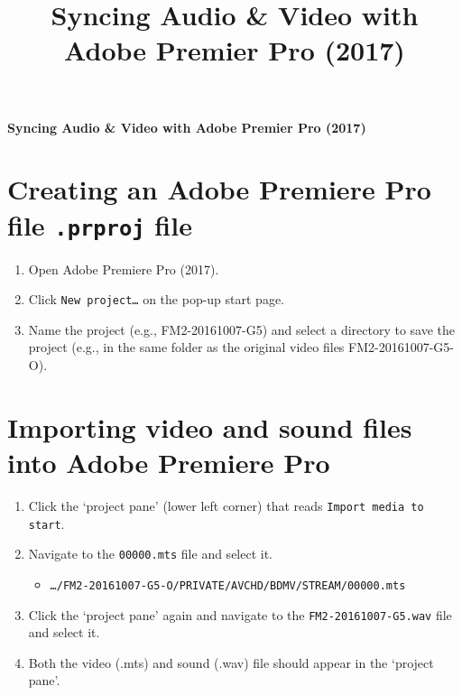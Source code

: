 \documentclass{article}
\title{Syncing Audio \& Video with Adobe Premier Pro (2017)}
\date{}
\newenvironment{myenv}[1]
  {\mdfsetup{
    frametitle={\colorbox{white}{\space#1\space}},
    innertopmargin=10pt,
    frametitleaboveskip=-\ht\strutbox,
    frametitlealignment=\center
    }
  \begin{mdframed}%
  }
  {\end{mdframed}}
\begin{document}
\thispagestyle{empty}
\begin{center}
{\Large\textbf{Syncing Audio \& Video with Adobe Premier Pro (2017)}}
\end{center}
%
%

\section*{Creating an Adobe Premiere Pro file \texttt{.prproj} file}
\begin{enumerate}
  \item Open Adobe Premiere Pro (2017).
  \item Click \texttt{New project\ldots} on the pop-up start page.
  \item Name the project (e.g., FM2-20161007-G5) and select a directory to save the project (e.g., in the same folder as the original video files FM2-20161007-G5-O).
\end{enumerate}

\section*{Importing video and sound files into Adobe Premiere Pro}
\begin{enumerate}
  \item Click the `project pane' (lower left corner) that reads \texttt{Import media to start}. 
  \item Navigate to the \texttt{00000.mts} file and select it. 
    \begin{itemize}
      \item \texttt{\ldots/FM2-20161007-G5-O/PRIVATE/AVCHD/BDMV/STREAM/00000.mts}
    \end{itemize}
  \item Click the `project pane' again and navigate to the \texttt{FM2-20161007-G5.wav} file and select it.
  \item Both the video (.mts) and sound (.wav) file should appear in the `project pane'.
\end{enumerate}
\end{document}
